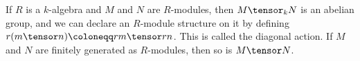 If $R$ is a $k$-algebra and $M$ and $N$ are $R$-modules, then $M\tensor_k N$ is
an abelian group, and we can declare an $R$-module structure on it
by defining $r(m\tensor n)\coloneqq rm\tensor rn$. This is called the diagonal
action. If $M$ and $N$ are finitely generated as $R$-modules, then so is
$M\tensor N$.
